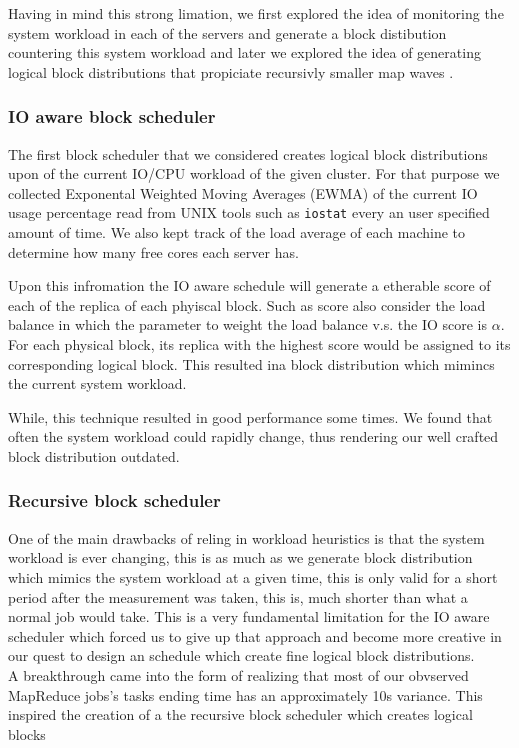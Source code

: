 Having in mind this strong limation, we first explored the idea of monitoring the system workload in each of the servers and generate a block distibution countering this system workload and later we explored the idea of generating logical block distributions that propiciate recursivly smaller map waves .


\subsubsection{IO aware block scheduler}
The first block scheduler that we considered creates logical block distributions upon of the current IO/CPU workload of the given cluster. For that purpose we collected Exponental Weighted Moving Averages (EWMA) of the current IO usage percentage read from UNIX tools such as \texttt{iostat} every an user specified amount of time. We also kept track of the load average of each machine to determine how many free cores each server has.

Upon this infromation the IO aware schedule will generate a etherable score of each of the replica of each phyiscal block. Such as score also consider the load balance in which the parameter to weight the load balance v.s. the IO score is $\alpha$.
For each physical block, its replica with the highest score would be assigned to its corresponding logical block. This resulted ina block distribution which mimincs the current system workload. 

While, this technique resulted in good performance some times. We found that often the system workload could rapidly change, thus rendering our well crafted block distribution outdated.

\subsubsection{Recursive block scheduler}
One of the main drawbacks of reling in workload heuristics is that the system workload is ever changing, this is as much as we generate block distribution which mimics the system workload at a given time, this is only valid for a short period after the measurement was taken, this is, much shorter than what a normal job would take. This is a very fundamental limitation for the IO aware scheduler which forced us to give up that approach and become more creative in our quest to design an schedule which create fine logical block distributions. \\

A breakthrough came into the form of realizing that most of our obvserved MapReduce jobs's tasks ending time has an approximately 10s variance. This inspired the creation of a the recursive block scheduler which creates logical blocks 

